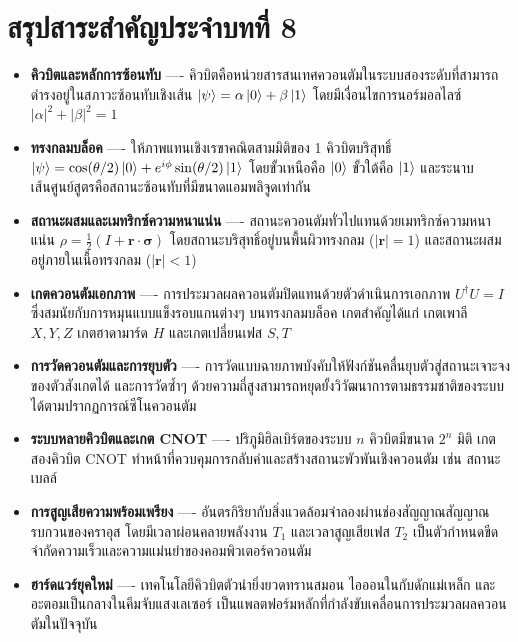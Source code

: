 \section{สรุปสาระสำคัญประจำบทที่ 8}

\begin{itemize}
    \item \textbf{คิวบิตและหลักการซ้อนทับ} ---- คิวบิตคือหน่วยสารสนเทศควอนตัมในระบบสองระดับที่สามารถดำรงอยู่ในสภาวะซ้อนทับเชิงเส้น $\ket{\psi} = \alpha\ket{0} + \beta\ket{1}$ โดยมีเงื่อนไขการนอร์มอลไลซ์ $|\alpha|^2 + |\beta|^2 = 1$
    \item \textbf{ทรงกลมบล็อค} ---- ให้ภาพแทนเชิงเรขาคณิตสามมิติของ 1 คิวบิตบริสุทธิ์ $\ket{\psi} = \cos(\theta/2)\ket{0} + e^{i\phi}\sin(\theta/2)\ket{1}$ โดยขั้วเหนือคือ $\ket{0}$ ขั้วใต้คือ $\ket{1}$ และระนาบเส้นศูนย์สูตรคือสถานะซ้อนทับที่มีขนาดแอมพลิจูดเท่ากัน
    \item \textbf{สถานะผสมและเมทริกซ์ความหนาแน่น} ---- สถานะควอนตัมทั่วไปแทนด้วยเมทริกซ์ความหนาแน่น $\rho = \frac{1}{2}(I + \mathbf{r}\cdot\boldsymbol{\sigma})$ โดยสถานะบริสุทธิ์อยู่บนพื้นผิวทรงกลม ($|\mathbf{r}| = 1$) และสถานะผสมอยู่ภายในเนื้อทรงกลม ($|\mathbf{r}| < 1$)
    \item \textbf{เกตควอนตัมเอกภาพ} ---- การประมวลผลควอนตัมปิดแทนด้วยตัวดำเนินการเอกภาพ $U^\dagger U = I$ ซึ่งสมนัยกับการหมุนแบบแข็งรอบแกนต่างๆ บนทรงกลมบล็อค เกตสำคัญได้แก่ เกตเพาลี $X, Y, Z$ เกตฮาดามาร์ด $H$ และเกตเปลี่ยนเฟส $S, T$
    \item \textbf{การวัดควอนตัมและการยุบตัว} ---- การวัดแบบฉายภาพบังคับให้ฟังก์ชันคลื่นยุบตัวสู่สถานะเจาะจงของตัวสังเกตได้ และการวัดซ้ำๆ ด้วยความถี่สูงสามารถหยุดยั้งวิวัฒนาการตามธรรมชาติของระบบได้ตามปรากฏการณ์ซีโนควอนตัม
    \item \textbf{ระบบหลายคิวบิตและเกต CNOT} ---- ปริภูมิฮิลเบิร์ตของระบบ $n$ คิวบิตมีขนาด $2^n$ มิติ เกตสองคิวบิต CNOT ทำหน้าที่ควบคุมการกลับค่าและสร้างสถานะพัวพันเชิงควอนตัม เช่น สถานะเบลล์
    \item \textbf{การสูญเสียความพร้อมเพรียง} ---- อันตรกิริยากับสิ่งแวดล้อมจำลองผ่านช่องสัญญาณสัญญาณรบกวนของคราอุส โดยมีเวลาผ่อนคลายพลังงาน $T_1$ และเวลาสูญเสียเฟส $T_2$ เป็นตัวกำหนดขีดจำกัดความเร็วและความแม่นยำของคอมพิวเตอร์ควอนตัม
    \item \textbf{ฮาร์ดแวร์ยุคใหม่} ---- เทคโนโลยีคิวบิตตัวนำยิ่งยวดทรานสมอน ไอออนในกับดักแม่เหล็ก และอะตอมเป็นกลางในคีมจับแสงเลเซอร์ เป็นแพลตฟอร์มหลักที่กำลังขับเคลื่อนการประมวลผลควอนตัมในปัจจุบัน
\end{itemize}

